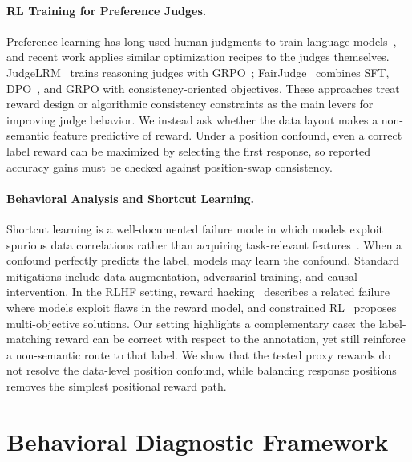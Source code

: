 \documentclass[11pt]{article}
\begin{document}
\paragraph{RL Training for Preference Judges.}
Preference learning has long used human judgments to train language models~\citep{christiano2017deep,stiennon2020learning,ouyang2022training,bai2022training}, and recent work applies similar optimization recipes to the judges themselves. JudgeLRM~\citep{chen2025judgelrm} trains reasoning judges with GRPO~\citep{shao2024deepseekmath}; FairJudge~\citep{fairjudge2026} combines SFT, DPO~\citep{rafailov2023direct}, and GRPO with consistency-oriented objectives. These approaches treat reward design or algorithmic consistency constraints as the main levers for improving judge behavior. We instead ask whether the data layout makes a non-semantic feature predictive of reward. Under a position confound, even a correct label reward can be maximized by selecting the first response, so reported accuracy gains must be checked against position-swap consistency.

\paragraph{Behavioral Analysis and Shortcut Learning.}
Shortcut learning is a well-documented failure mode in which models exploit spurious data correlations rather than acquiring task-relevant features~\citep{geirhos2020shortcut,mccoy2019right,tu2020empirical}. When a confound perfectly predicts the label, models may learn the confound. Standard mitigations include data augmentation, adversarial training, and causal intervention. In the RLHF setting, reward hacking~\citep{skalse2022defining,gao2023scaling,pan2024spontaneous} describes a related failure where models exploit flaws in the reward model, and constrained RL~\citep{moskovitz2024confronting} proposes multi-objective solutions. Our setting highlights a complementary case: the label-matching reward can be correct with respect to the annotation, yet still reinforce a non-semantic route to that label. We show that the tested proxy rewards do not resolve the data-level position confound, while balancing response positions removes the simplest positional reward path.

\section{Behavioral Diagnostic Framework}
\end{document}
